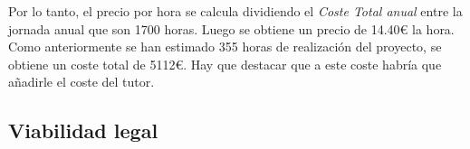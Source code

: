 Por lo tanto, el precio por hora se calcula dividiendo el \emph{Coste Total anual} entre la jornada anual que son 1700 horas. Luego se obtiene un precio de 14.40\euro{} la hora. Como anteriormente se han estimado 355 horas de realización del proyecto, se obtiene un coste total de 5112\euro{}. 
Hay que destacar que a este coste habría que añadirle el coste del tutor. 

\subsection{Viabilidad legal}


